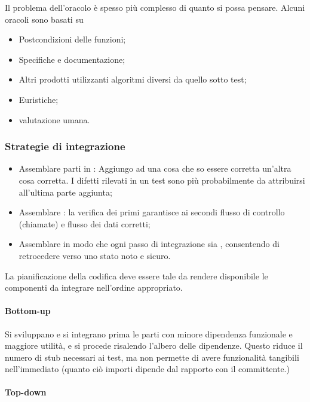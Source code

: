 Il problema dell'oracolo è spesso più complesso di quanto si possa pensare.
Alcuni oracoli sono basati su

\begin{itemize}
  \item Postcondizioni delle funzioni;
  \item Specifiche e documentazione;
  \item Altri prodotti utilizzanti algoritmi diversi da quello sotto test;
  \item Euristiche;
  \item valutazione umana.
\end{itemize}

\subsubsection{Strategie di integrazione}
\label{ssub:strategie_di_integrazione}

\begin{itemize}
  \item Assemblare parti in : Aggiungo ad una
    cosa che so essere corretta un'altra cosa corretta. I difetti rilevati in un
    test sono più probabilmente da attribuirsi all'ultima parte aggiunta;
  \item Assemblare : la verifica dei
    primi garantisce ai secondi flusso di controllo (chiamate) e flusso dei dati
    corretti;
  \item Assemblare in modo che ogni passo di integrazione sia
    , consentendo di retrocedere verso uno stato noto e
    sicuro.
\end{itemize}

La pianificazione della codifica deve essere tale da rendere disponibile le
componenti da integrare nell'ordine appropriato.

\paragraph{Bottom-up}
\label{par:bottom_up}

Si sviluppano e si integrano prima le parti con minore dipendenza funzionale e
maggiore utilità, e si procede risalendo l'albero delle dipendenze. Questo
riduce il numero di stub necessari ai test, ma non permette di avere
funzionalità tangibili nell'immediato (quanto ciò importi dipende dal rapporto
con il committente.)

\paragraph{Top-down}
\label{par:top_down}

